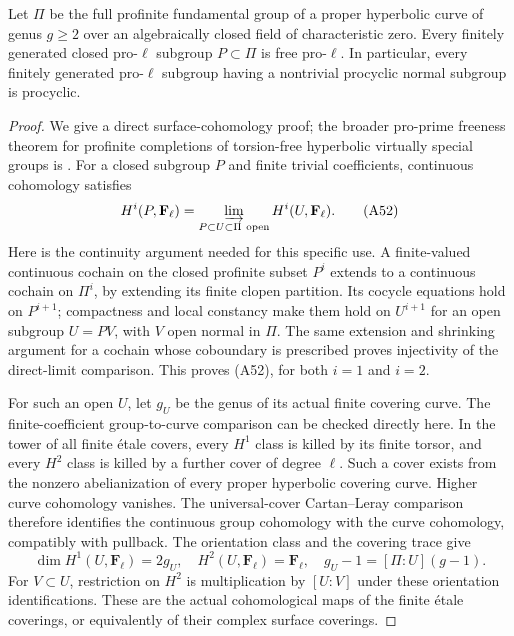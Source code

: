 \begin{lemma}
\label{A:surface-proprime-free}
Let $\Pi$ be the full profinite fundamental group
of a proper hyperbolic curve of genus $g\ge2$
over an algebraically closed field of characteristic
zero. Every finitely generated closed pro-$\ell$
subgroup $P\subset\Pi$ is free pro-$\ell$.
In particular, every finitely generated pro-$\ell$
subgroup having a nontrivial procyclic normal
subgroup is procyclic.
\end{lemma}
\begin{proof}
We give a direct surface-cohomology proof; the
broader pro-prime freeness theorem for profinite
completions of torsion-free hyperbolic virtually
special groups is \cite[Theorem F]{A_WiltonZalesskii2017}.
For a closed subgroup $P$ and finite trivial
coefficients, continuous cohomology satisfies
\[
 H^i(P,\mathbf F_\ell)
       =\varinjlim_{P\subset U\subset\Pi\ \mathrm{open}}
                          H^i(U,\mathbf F_\ell).          \tag{A52}
\]
Here is the continuity argument needed for this
specific use. A finite-valued continuous cochain
on the closed profinite subset $P^i$ extends
to a continuous cochain on $\Pi^i$, by extending
its finite clopen partition. Its cocycle
equations hold on $P^{i+1}$; compactness and
local constancy make them hold on $U^{i+1}$
for an open subgroup $U=P V$, with $V$ open
normal in $\Pi$. The same extension and
shrinking argument for a cochain whose
coboundary is prescribed proves injectivity
of the direct-limit comparison. This proves
(A52), for both $i=1$ and $i=2$.

For such an open $U$, let $g_U$ be the genus
of its actual finite covering curve. The
finite-coefficient group-to-curve comparison
can be checked directly here. In the tower of
all finite \'etale covers, every $H^1$ class
is killed by its finite torsor, and every
$H^2$ class is killed by a further cover of
degree $\ell$. Such a cover exists from
the nonzero abelianization of every proper
hyperbolic covering curve. Higher curve
cohomology vanishes. The universal-cover
Cartan--Leray comparison therefore identifies
the continuous group cohomology with the
curve cohomology, compatibly with pullback.
The
orientation class and the covering trace give
\[
 \dim H^1(U,\mathbf F_\ell)=2g_U,
 \quad H^2(U,\mathbf F_\ell)=\mathbf F_\ell,
 \quad g_U-1=[\Pi:U](g-1).                                \tag{A53}
\]
For $V\subset U$, restriction on $H^2$ is
multiplication by $[U:V]$ under these orientation
identifications. These are the actual
cohomological maps of the finite \'etale
coverings, or equivalently of their complex
surface coverings.


\end{proof}
